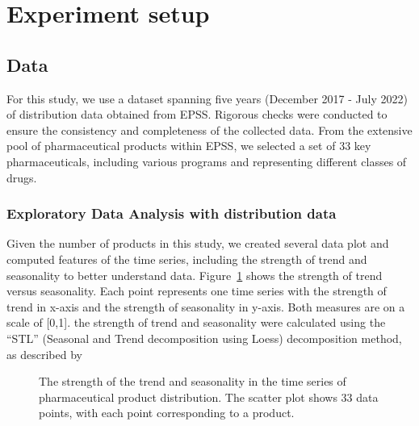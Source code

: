 \documentclass[
  authoryear,
  preprint,
  3p]{elsarticle}
\begin{document}
\section{Experiment setup}\label{sec-experiment}

\subsection{Data}\label{sec-data}

For this study, we use a dataset spanning five years (December 2017 -
July 2022) of distribution data obtained from EPSS. Rigorous checks were
conducted to ensure the consistency and completeness of the collected
data. From the extensive pool of pharmaceutical products within EPSS, we
selected a set of 33 key pharmaceuticals, including various programs and
representing different classes of drugs.

\subsubsection{Exploratory Data Analysis with distribution
data}\label{exploratory-data-analysis-with-distribution-data}

Given the number of products in this study, we created several data plot
and computed features of the time series, including the strength of
trend and seasonality to better understand data.
Figure~\ref{fig-feature} shows the strength of trend versus seasonality.
Each point represents one time series with the strength of trend in
x-axis and the strength of seasonality in y-axis. Both measures are on a
scale of {[}0,1{]}. the strength of trend and seasonality were
calculated using the ``STL'' (Seasonal and Trend decomposition using
Loess) decomposition method, as described by \citet{bandara2025mstl}

\begin{figure}


\caption{\label{fig-feature}The strength of the trend and seasonality in
the time series of pharmaceutical product distribution. The scatter plot
shows 33 data points, with each point corresponding to a product.}

\end{figure}%
\end{document}
